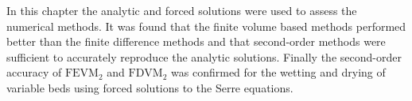 \medskip
In this chapter the analytic and forced solutions were used to assess the numerical methods. It was found that the finite volume based methods performed better than the finite difference methods and that second-order methods were sufficient to accurately reproduce the analytic solutions. Finally the second-order accuracy of $\text{FEVM}_2$ and $\text{FDVM}_2$ was confirmed for the wetting and drying of variable beds using forced solutions to the Serre equations.
